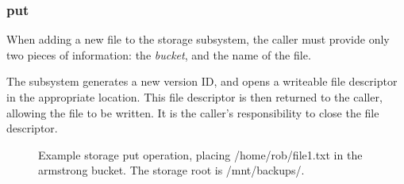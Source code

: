 \subsubsection{put}
\label{sec:implementation-server-storage-put}

When adding a new file to the storage subsystem, the caller must provide only
two pieces of information: the \emph{bucket}, and the name of the file.

The subsystem generates a new version ID, and opens a writeable file descriptor
in the appropriate location. This file descriptor is then returned to the
caller, allowing the file to be written. It is the caller's responsibility to
close the file descriptor.

\begin{figure}
    \caption{Example storage put operation, placing /home/rob/file1.txt in the
    armstrong bucket. The storage root is /mnt/backups/.}
    \label{fig:storage-put-example}
\end{figure}

